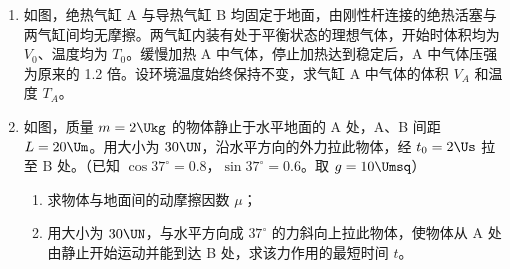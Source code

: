\documentclass[\gkver]{gaokaozhenti}
\begin{document}
\begin{enumerate}
{\begin{enumerate}
	\item
	$r_{1} = (k - 1)R_{1}$
\end{enumerate}
}

\item
如图，绝热气缸 A 与导热气缸 B 均固定于地面，由刚性杆连接的绝热活塞与两气缸间均无摩擦。两气缸内装有处于平衡状态的理想气体，开始时体积均为 $V_{0}$、温度均为 $T_{0}$。缓慢加热 A 中气体，停止加热达到稳定后，A 中气体压强为原来的 1.2 倍。设环境温度始终保持不变，求气缸 A 中气体的体积 $V_{A}$ 和温度 $T_{A}$。
\onepicture[align=right, w=4.75cm]{}

\item
如图，质量 $m = 2\Ukg$ 的物体静止于水平地面的 A 处，A、B 间距 $L = 20\Um$。用大小为 $30\UN$，沿水平方向的外力拉此物体，经 $t_{0} = 2\Us$ 拉至 B 处。（已知 $\cos 37^{\circ} = 0.8$，$\sin 37^{\circ} = 0.6$。取 $g = 10\Umsq$）
\begin{enumerate}
	\item
	求物体与地面间的动摩擦因数 $\mu$；
	\item
	用大小为 $30\UN$，与水平方向成 $37^{\circ}$ 的力斜向上拉此物体，使物体从 A 处由静止开始运动并能到达 B 处，求该力作用的最短时间 $t$。
\end{enumerate}
\onepicture[align=right, w=5.52cm]{}
\end{enumerate}
\end{document}
